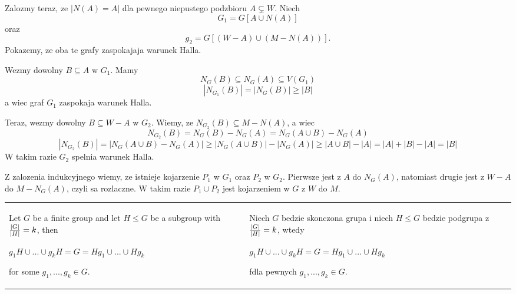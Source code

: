 Zalozmy teraz, ze $|N(A)=A|$ dla pewnego niepustego podzbioru $A\subsetneq W$. Niech
$$G_1=G[A\cup N(A)]$$ 
oraz 
$$g_2=G[(W-A)\cup(M-N(A))].$$
Pokazemy, ze oba te grafy zaspokajaja warunek Halla.

Wezmy dowolny $B\subseteq A$ w $G_1$. Mamy
$$N_G(B)\subseteq N_G(A)\subseteq V(G_1)$$
$$|N_{G_1}(B)|=|N_G(B)|\geq|B|$$
a wiec graf $G_1$ zaspokaja warunek Halla.

Teraz, wezmy dowolny $B\subseteq W-A$ w $G_2$. Wiemy, ze $N_{G_2}(B)\subseteq M-N(A)$, a wiec
$$N_{G_2}(B)= N_G(B)-N_G(A)=N_G(A\cup B)-N_G(A)$$
$$|N_{G_2}(B)|=|N_G(A\cup B)-N_G(A)|\geq |N_G(A\cup B)|-|N_G(A)|\geq |A\cup B|-|A|=|A|+|B|-|A|=|B|$$
W takim razie $G_2$ spelnia warunek Halla.
\smallskip

Z zalozenia indukcyjnego wiemy, ze istnieje kojarzenie $P_1$ w $G_1$ oraz $P_2$ w $G_2$. Pierwsze jest z $A$ do $N_G(A)$, natomiast drugie jest z $W-A$ do $M-N_G(A)$, czyli sa rozlaczne. W takim razie $P_1\cup P_2$ jest kojarzeniem w $G$ z $W$ do $M$.
\bigskip

\bigskip

\begin{tabularx}{\textwidth}{ X!{\color{git90gray}\vrule} X}

    Let $G$ be a finite group and let $H\leq G$ be a subgroup with ${|G|\over|H|}=k$, then

    $g_1H\cup ...\cup g_kH=G=Hg_1\cup...\cup Hg_k$

    for some $g_1,...,g_k\in G$.

    &

    Niech $G$ bedzie skonczona grupa i niech $H\leq G$ bedzie podgrupa z ${|G|\over|H|}=k$, wtedy


    $g_1H\cup ...\cup g_kH=G=Hg_1\cup...\cup Hg_k$
    
    fdla pewnych $g_1,...,g_k\in G$.

\end{tabularx}